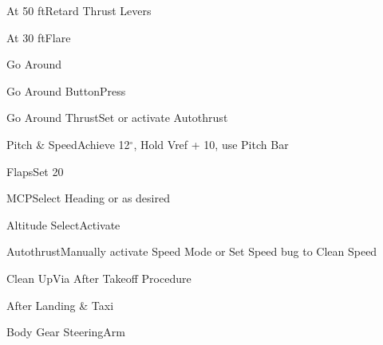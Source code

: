 \documentclass[sim-use, blue_items]{checklist}
\begin{document}
\begin{continuedchecklist}
	\item{At 50 ft}{Retard Thrust Levers}
	\item{At 30 ft}{Flare}
\end{continuedchecklist}

\begin{checklist}{Go Around}
	\item{Go Around Button}{Press}
	\item{Go Around Thrust}{Set or activate Autothrust}
	\item{Pitch \& Speed}{Achieve 12$^\circ$, Hold Vref + 10, use Pitch Bar}
	\item{Flaps}{Set 20}
	\item{MCP}{Select Heading or as desired}
	\item{Altitude Select}{Activate}
	\item{Autothrust}{Manually activate Speed Mode or Set Speed bug to Clean Speed}
	\item{Clean Up}{Via After Takeoff Procedure}
\end{checklist}

\begin{checklist}{After Landing \& Taxi}
	\item{Body Gear Steering}{Arm}
\end{checklist}
\end{document}

